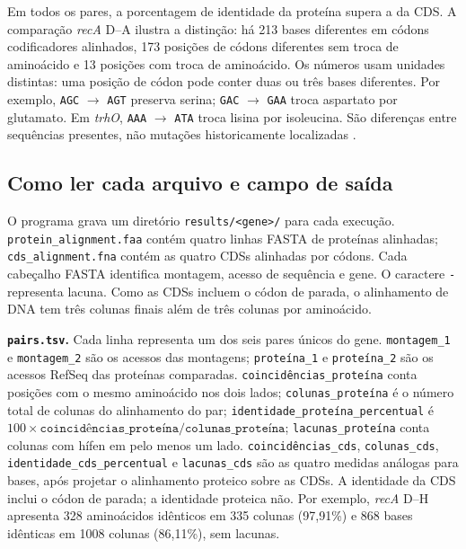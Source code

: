 \documentclass[12pt]{article}
\begin{document}
Em todos os pares, a porcentagem de identidade da proteína supera a da CDS.
A comparação \textit{recA} D--A ilustra a distinção: há 213 bases diferentes
em códons codificadores alinhados, 173 posições de códons diferentes sem troca
de aminoácido e 13 posições com troca de aminoácido. Os números usam unidades
distintas: uma posição de códon pode conter duas ou três bases diferentes.
Por exemplo, \texttt{AGC} $\rightarrow$ \texttt{AGT} preserva serina;
\texttt{GAC} $\rightarrow$ \texttt{GAA} troca aspartato por glutamato. Em
\textit{trhO}, \texttt{AAA} $\rightarrow$ \texttt{ATA} troca lisina por
isoleucina. São diferenças entre sequências presentes, não mutações
historicamente localizadas \cite{yang2006,zhang1997}.

\subsection{Como ler cada arquivo e campo de saída}

O programa grava um diretório \texttt{results/<gene>/} para cada execução.
\texttt{protein\_alignment.faa} contém quatro linhas FASTA de proteínas
alinhadas; \texttt{cds\_alignment.fna} contém as quatro CDSs alinhadas por
códons. Cada cabeçalho FASTA identifica montagem, acesso de sequência e gene.
O caractere \texttt{-} representa lacuna. Como as CDSs incluem o códon de
parada, o alinhamento de DNA tem três colunas finais além de três colunas
por aminoácido.

\noindent\textbf{\texttt{pairs.tsv}.} Cada linha representa um dos seis pares
únicos do gene. \texttt{montagem\_1} e \texttt{montagem\_2} são os acessos
das montagens; \texttt{proteína\_1} e \texttt{proteína\_2} são os acessos
RefSeq das proteínas comparadas. \texttt{coincidências\_proteína} conta posições
com o mesmo aminoácido nos dois lados; \texttt{colunas\_proteína} é o número
total de colunas do alinhamento do par; \texttt{identidade\_proteína\_percentual}
é $100\times\texttt{coincidências\_proteína}/\texttt{colunas\_proteína}$;
\texttt{lacunas\_proteína} conta colunas com hífen em pelo menos um lado.
\texttt{coincidências\_cds}, \texttt{colunas\_cds},
\texttt{identidade\_cds\_percentual} e \texttt{lacunas\_cds} são as quatro medidas
análogas para bases, após projetar o alinhamento proteico sobre as CDSs. A
identidade da CDS inclui o códon de parada; a identidade proteica não.
Por exemplo, \textit{recA} D--H apresenta 328 aminoácidos idênticos em 335
colunas (97,91\%) e 868 bases idênticas em 1008 colunas (86,11\%), sem
lacunas.
\end{document}
